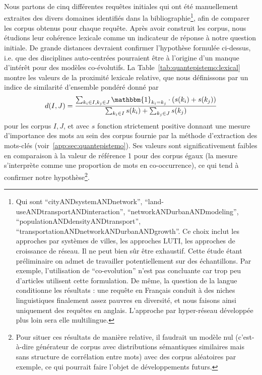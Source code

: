 {Nous partons de cinq différentes requêtes initiales qui ont été manuellement extraites des divers domaines identifiés dans la bibliographie\footnote{Qui sont ``cityANDsystemANDnetwork'', ``land-useANDtransportANDinteraction'', ``networkANDurbanANDmodeling'', ``populationANDdensityANDtransport'', ``transportationANDnetworkANDurbanANDgrowth''. Ce choix inclut les approches par systèmes de villes, les approches LUTI, les approches de croissance de réseau. Il ne peut bien sûr être exhaustif. Cette étude étant préliminaire on admet de travailler potentiellement sur des échantillons. Par exemple, l'utilisation de ``co-evolution'' n'est pas concluante car trop peu d'articles utilisent cette formulation. De même, la question de la langue conditionne les résultats : une requête en Français conduit à des niches linguistiques finalement assez pauvres en diversité, et nous faisons ainsi uniquement des requêtes en anglais. L'approche par hyper-réseau développée plus loin sera elle multilingue.}, afin de comparer les corpus obtenus pour chaque requête. Après avoir construit les corpus, nous étudions leur cohérence lexicale comme un indicateur de réponse à notre question initiale. De grande distances devraient confirmer l'hypothèse formulée ci-dessus, i.e. que des disciplines auto-centrées pourraient être à l'origine d'un manque d'intérêt pour des modèles co-évolutifs. La Table~\ref{tab:quantepistemo:lexical} montre les valeurs de la proximité lexicale relative, que nous définissons par un indice de similarité d'ensemble pondéré donné par
\[
d(I,J) = \frac{\sum_{k_i \in I, k_j \in J} \mathbbm{1}_{k_i = k_j} \cdot (s(k_i) + s(k_j))}{\sum_{k_i \in I} s(k_i) + \sum_{k_j \in J} s(k_j)}
\]
pour les corpus $I,J$, et avec $s$ fonction strictement positive donnant une mesure d'importance des mots au sein des corpus fournie par la méthode d'extraction des mots-clés (voir~\ref{app:sec:quantepistemo}). Ses valeurs sont significativement faibles en comparaison à la valeur de référence 1 pour des corpus égaux (la mesure s'interprète comme une proportion de mots en co-occurrence), ce qui tend à confirmer notre hypothèse\footnote{Pour situer ces résultats de manière relative, il faudrait un modèle nul (c'est-à-dire générateur de corpus avec distributions sémantiques similaires mais sans structure de corrélation entre mots) avec des corpus aléatoires par exemple, ce qui pourrait faire l'objet de développements futurs.}.
}




